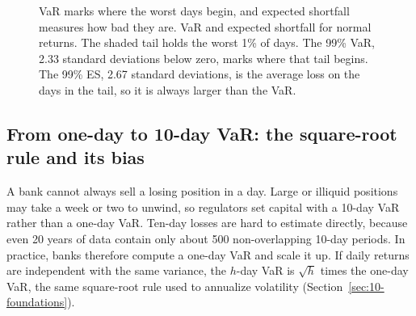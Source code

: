 \begin{figure}[htbp]
\centering
{}
\caption{VaR marks where the worst days begin, and expected shortfall measures how bad they are. VaR and expected shortfall for normal returns. The shaded tail holds the worst 1\% of days. The 99\% VaR, 2.33 standard deviations below zero, marks where that tail begins. The 99\% ES, 2.67 standard deviations, is the average loss on the days in the tail, so it is always larger than the VaR.}
\label{fig:11-var-es}
\end{figure}

\subsection{From one-day to 10-day VaR: the square-root rule and its bias}


A bank cannot always sell a losing position in a day. Large or illiquid positions may take a week or two to unwind, so regulators set capital with a 10-day VaR rather than a one-day VaR. Ten-day losses are hard to estimate directly, because even 20 years of data contain only about 500 non-overlapping 10-day periods. In practice, banks therefore compute a one-day VaR and scale it up. If daily returns are independent with the same variance, the $h$-day VaR is $\sqrt{h}$ times the one-day VaR, the same square-root rule used to annualize volatility (Section~\ref{sec:10-foundations}).

